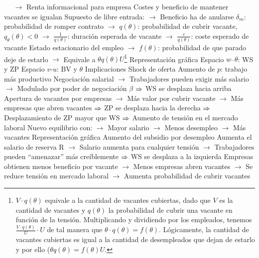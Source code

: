 \documentclass{nuevotema}
\begin{document}
\begin{esquemal}
				\4[] $\quad$ $\to$ Renta informacional para empresa
				\4[ZP] Costes y beneficio de mantener vacantes se igualan
				\4[] Supuesto de libre entrada:
				\4[] $\to$ Beneficio ha de anularse
				\4[] 
				\4[] $\delta_m$: probabilidad de romper contrato
				\4[] $\to$ $q(\theta)$: probabilidad de cubrir vacante, $q_\theta(\theta) <0$
				\4[] $\to$ $\frac{1}{q(\theta)}$: duración esperada de vacante
				\4[] $\to$ $\frac{c}{q(\theta)}$: coste esperado de vacante
				\4[BV] Estado estacionario del empleo
				\4[] 
				\4[] $\to$ $f(\theta)$: probabilidad de que parado deje de estarlo
				\4[] $\to$ Equivale a $\theta q(\theta) U$\footnote{$V \cdot q(\theta)$ equivale a la cantidad de vacantes cubiertas, dado que $V$ es la cantidad de vacantes y $q(\theta)$ la probabilidad de cubrir una vacante en función de la tensión. Multiplicando y dividiendo por los empleados, tenemos $\frac{V \cdot q(\theta)}{U} \cdot U$ de tal manera que $\theta \cdot q(\theta) = f(\theta)$. Lógicamente, la cantidad de vacantes cubiertas es igual a la cantidad de desempleados que dejan de estarlo y por ello ($\theta q(\theta) = f(\theta) U$.}
				\4 Representación gráfica
				\4[] Espacio $w$--$\theta$: WS y ZP
				\4[] \grafica{wszp}
				\4[] Espacio $v$-$u$: BV y $\theta$
				\4[] 
			\3 Implicaciones
				\4 Shock de oferta
				\4[] Aumento de $p$: trabajo más productivo
				\4[] Negociación salarial
				\4[] $\to$ Trabajadores pueden exigir más salario
				\4[] $\to$ Modulado por poder de negociación $\beta$
				\4[] $\Rightarrow$ WS se desplaza hacia arriba
				\4[] Apertura de vacantes por empresas
				\4[] $\to$ Más valor por cubrir vacante
				\4[] $\to$ Más empresas que abren vacantes
				\4[] $\Rightarrow$ ZP se desplaza hacia la derecha
				\4[] $\Rightarrow$ Desplazamiento de ZP mayor que WS
				\4[] $\Rightarrow$ Aumento de tensión en el mercado laboral
				\4[] Nuevo equilibrio con:
				\4[] $\to$ Mayor salario
				\4[] $\to$ Menos desempleo
				\4[] $\to$ Más vacantes
				\4[] Representación gráfica
				\4[] 
				\4 Aumento del subsidio por desempleo
				\4[] Aumenta el salario de reserva R
				\4[] $\to$ Salario aumenta para cualquier tensión
				\4[] $\to$ Trabajadores pueden ``amenazar'' más creíblemente
				\4[] $\Rightarrow$ WS se desplaza a la izquierda
				\4[] Empresas obtienen menos beneficio por vacante
				\4[] $\to$ Menos empresas abren vacantes
				\4[] $\to$ Se reduce tensión en mercado laboral
				\4[] $\to$ Aumenta probabilidad de cubrir vacantes

\end{esquemal}
\end{document}
